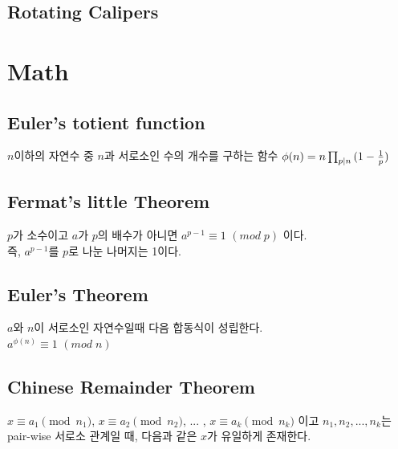 \documentclass[10pt,landscape,a4paper,twocolumn]{article}
\begin{document}
\subsection{Rotating Calipers}


\iffalse
\subsection{Plane Sweeping with Segment Tree}
시간복잡도 : $O(N\log{N})$

\fi



\section{Math}
\subsection{Euler's totient function}
$n$이하의 자연수 중 $n$과 서로소인 수의 개수를 구하는 함수
$\phi(n)=n \prod_{p|n} {(1-{1 \over p})}$

\subsection{Fermat's little Theorem}
$p$가 소수이고 $a$가 $p$의 배수가 아니면 $a^{p-1} \equiv 1$ \hspace{0.3em} $(mod\;p)$ 이다.\\
즉, $a^{p-1}$를 $p$로 나눈 나머지는 1이다.

\subsection{Euler's Theorem}
$a$와 $n$이 서로소인 자연수일때 다음 합동식이 성립한다.\\
$a^{\phi(n)}\equiv 1$ \hspace{0.3em} $(mod\;n)$\\

\subsection{Chinese Remainder Theorem}
$x \equiv a_1 \pmod{n_1}$, $x \equiv a_2 \pmod{n_2}$, ... , $x \equiv a_k \pmod{n_k}$ 이고 $n_1, n_2, ... , n_k$는 pair-wise 서로소 관계일 때, 다음과 같은 $x$가 유일하게 존재한다.\\
\end{document}

